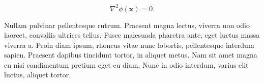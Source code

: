 \documentclass[10pt]{article}
\renewcommand{\vec}[1]{\bm{#1}}
\begin{document}
\begin{equation}
  \nabla^2 \phi(\vec{x}) = 0.
\end{equation}

Nullam pulvinar pellentesque rutrum. Praesent magna lectus, viverra
non odio laoreet, convallis ultrices tellus. Fusce malesuada pharetra
ante, eget luctus massa viverra a. Proin diam ipsum, rhoncus vitae
nunc lobortis, pellentesque interdum sapien. Praesent dapibus
tincidunt tortor, in aliquet metus. Nam sit amet magna eu nisi
condimentum pretium eget eu diam. Nunc in odio interdum, varius elit
luctus, aliquet tortor. 
\end{document}
